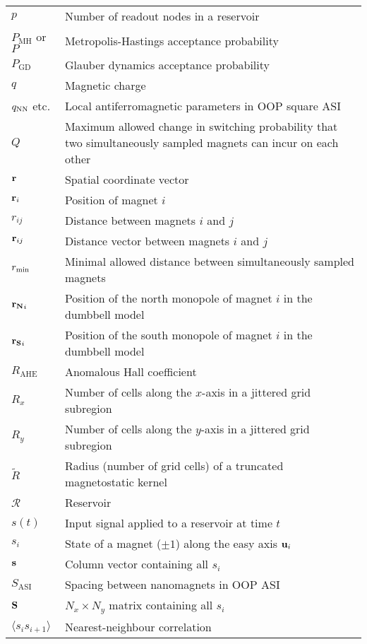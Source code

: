 \begin{longtable}[l]{p{60pt} p{350pt}}
	$p$ & Number of readout nodes in a reservoir \\
	$P_\mathrm{MH}$ or $P$ & Metropolis-Hastings acceptance probability \\
	$P_\mathrm{GD}$ & Glauber dynamics acceptance probability \\[\whiteline]

	$q$ & Magnetic charge \\
	$q_\mathrm{NN}$ etc. & Local antiferromagnetic parameters in OOP square ASI \\
	$Q$ & Maximum allowed change in switching probability that two simultaneously sampled magnets can incur on each other \\[\whiteline]

	$\boldsymbol{\mathbf{r}}$ & Spatial coordinate vector \\
	$\boldsymbol{\mathbf{r}}_i$ & Position of magnet $i$ \\
	$r_{ij}$ & Distance between magnets $i$ and $j$ \\
	$\boldsymbol{\mathbf{r}}_{ij}$ & Distance vector between magnets $i$ and $j$ \\
	$r_\mathrm{min}$ & Minimal allowed distance between simultaneously sampled magnets \\
	$\boldsymbol{\mathbf{r_N}}_i$ & Position of the north monopole of magnet $i$ in the dumbbell model \\
	$\boldsymbol{\mathbf{r_S}}_i$ & Position of the south monopole of magnet $i$ in the dumbbell model \\
	$R_\mathrm{AHE}$ & Anomalous Hall coefficient \\
	$R_x$ & Number of cells along the $x$-axis in a jittered grid subregion \\
	$R_y$ & Number of cells along the $y$-axis in a jittered grid subregion \\
	$\widetilde{R}$ & Radius (number of grid cells) of a truncated magnetostatic kernel \\
	$\mathcal{R}$ & Reservoir \\[\whiteline]

	$s(t)$ & Input signal applied to a reservoir at time $t$ \\
	$s_i$ & State of a magnet ($\pm 1$) along the easy axis $\boldsymbol{\mathbf{u}}_i$ \\
	$\boldsymbol{\mathbf{s}}$ & Column vector containing all $s_i$ \\
	$S_\mathrm{ASI}$ & Spacing between nanomagnets in OOP ASI \\
	$\boldsymbol{\mathbf{S}}$ & $N_x \times N_y$ matrix containing all $s_i$ \\
	$\langle s_i s_{i+1} \rangle$ & Nearest-neighbour correlation \\[\whiteline]


\end{longtable}
